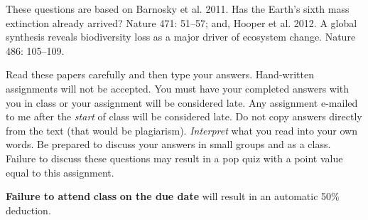 \documentclass[12pt, addpoints]{exam}
\begin{document}
These questions are based on Barnosky et al. 2011. Has the Earth's sixth
mass extinction already arrived? Nature 471: 51--57; and, Hooper et al.
2012. A global synthesis reveals biodiversity loss as a major driver of
ecosystem change. Nature 486: 105--109.

Read these papers carefully and then type your answers. Hand-written
assignments will not be accepted. You must have your completed answers
with you in class or your assignment will be considered late. Any
assignment e-mailed to me after the \emph{start} of class will be
considered late. Do not copy answers directly from the text (that would
be plagiarism). \emph{Interpret} what you read into your own words. Be
prepared to discuss your answers in small groups and as a class. Failure
to discuss these questions may result in a pop quiz with a point value
equal to this assignment.

\textbf{Failure to attend} \textbf{class} \textbf{on the due date} will
result in an automatic 50\% deduction.
\end{document}

